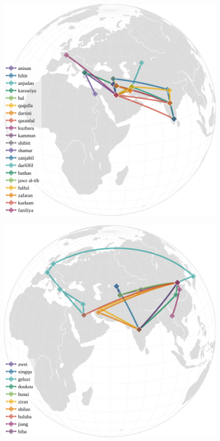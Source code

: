 \begin{figure}[ht!]
    \includegraphics[width=\linewidth]{imgs/plots/diffusion_ar.pdf}
    \caption{}
    \label{fig:diffusion_ar}
\end{figure}

\begin{figure}[ht!]
    \includegraphics[width=\linewidth]{imgs/plots/diffusion_zh.pdf}
    \caption{}
    \label{fig:diffusion_zh}
\end{figure}




















